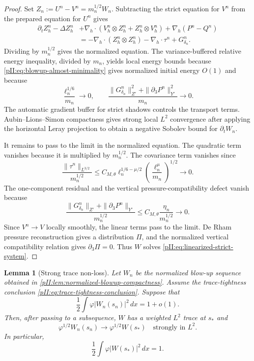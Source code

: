 \documentclass[11pt]{article}
\numberwithin{equation}{section}
\theoremstyle{plain}
\newtheorem{lemma}{Lemma}[section]
\theoremstyle{definition}
\theoremstyle{remark}
\newcommand{\dx}{\,dx}
\begin{document}
\begin{proof}
Set $Z_n:=U^n-V^n=m_n^{1/2}W_n$.  Subtracting the strict equation for $V^n$ from the prepared equation for $U^n$ gives
\[
\begin{aligned}
\partial_tZ^n_h-\Delta Z^n_h
&+\nabla_h\cdot(V^n_h\otimes Z^n_h+Z^n_h\otimes V^n_h)
+\nabla_h(P^n-Q^n)   \\
&= -\nabla_h\cdot(Z^n_h\otimes Z^n_h)-\nabla_h\cdot\tau^n+G^n_{\delta_n}.
\end{aligned}
\]
Dividing by $m_n^{1/2}$ gives the normalized equation.  The variance-buffered relative energy inequality, divided by $m_n$, yields local energy bounds because \eqref{pII:eq:blowup-almost-minimality} gives normalized initial energy $O(1)$ and because
\[
        \frac{\ell_n^{1/6}}{m_n}\to0,
        \qquad
        \frac{\|G^n_{\delta_n}\|_{Z'}^2+\|\partial_3P^n\|_{Y'}^2}{m_n}\to0.
\]
The automatic gradient buffer for strict shadows controls the transport terms.  Aubin--Lions--Simon compactness gives strong local $L^2$ convergence \cite{Simon1986} after applying the horizontal Leray projection to obtain a negative Sobolev bound for $\partial_tW_n$.

It remains to pass to the limit in the normalized equation.  The quadratic term vanishes because it is multiplied by $m_n^{1/2}$.  The covariance term vanishes since
\[
        \frac{\|\tau^n\|_{L^{3/2}}}{m_n^{1/2}}
        \le C_{M,\theta}\ell_n^{1/6-\mu/2}
        \left(\frac{\ell_n^\mu}{m_n}\right)^{1/2}\to0.
\]
The one-component residual and the vertical pressure-compatibility defect vanish because
\[
        \frac{\|G^n_{\delta_n}\|_{Z'}+\|\partial_3P^n\|_{Y'}}{m_n^{1/2}}
        \le C_{M,\theta}\frac{\eta_n}{m_n^{1/2}}\to0.
\]
Since $V^n\to V$ locally smoothly, the linear terms pass to the limit.  De Rham pressure reconstruction gives a distribution $\Pi$, and the normalized vertical compatibility relation gives $\partial_3\Pi=0$.  Thus $W$ solves \eqref{pII:eq:linearized-strict-system}.
\end{proof}

\begin{lemma}[Strong trace non-loss]\label{pII:lem:strong-trace-nonloss}
Let $W_n$ be the normalized blow-up sequence obtained in \cref{pII:lem:normalized-blowup-compactness}.  Assume the trace-tightness conclusion \eqref{pII:eq:trace-tightness-conclusion}.  Suppose that
\[
        \frac12\int\varphi|W_n(s_n)|^2\dx=1+o(1).
\]
Then, after passing to a subsequence, $W$ has a weighted $L^2$ trace at $s_*$ and
\[
        \varphi^{1/2}W_n(s_n)\to \varphi^{1/2}W(s_*)
        \quad\text{strongly in }L^2.
\]
In particular,
\begin{equation}\label{pII:eq:nonzero-trace-limit}
        \frac12\int\varphi|W(s_*)|^2\dx=1.
\end{equation}
\end{lemma}
\end{document}

